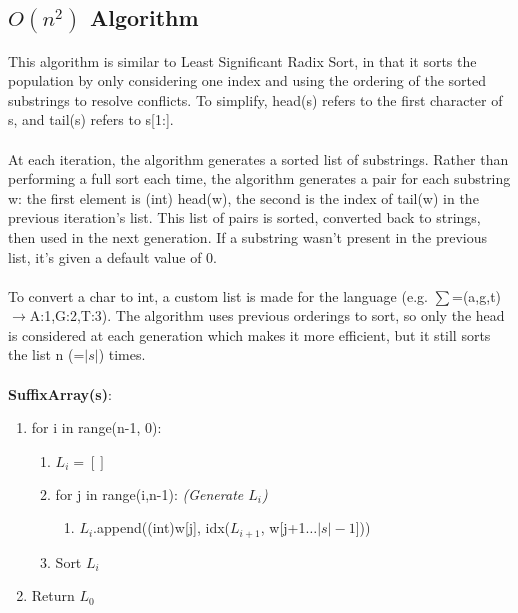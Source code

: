 \subsection{$O(n^2)$ Algorithm}
This algorithm is similar to Least Significant Radix Sort, in that it sorts the population by only considering one index and using the ordering of the sorted substrings to resolve conflicts. To simplify, head(s) refers to the first character of s, and tail(s) refers to s[1:]. \\ \\
At each iteration, the algorithm generates a sorted list of substrings. Rather than performing a full sort each time, the algorithm generates a pair for each substring w: the first element is (int) head(w), the second is the index of tail(w) in the previous iteration's list. This list of pairs is sorted, converted back to strings, then used in the next generation. If a substring wasn't present in the previous list, it's given a default value of 0. \\ \\
To convert a char to int, a custom list is made for the language (e.g. $\sum$=(a,g,t)$\rightarrow$A:1,G:2,T:3). The algorithm uses previous orderings to sort, so only the head is considered at each generation which makes it more efficient, but it still sorts the list n (=$|s|$) times. \\ \\
\textbf{SuffixArray(s)}:
\begin{enumerate}[label=\Alph*]
    \item for i in range(n-1, 0):
\begin{enumerate}[label=\arabic*]
    \item $L_i = []$
    \item for j in range(i,n-1): \emph{(Generate $L_i$)}
    \begin{enumerate}
        \item [] $L_i$.append((int)w[j], idx($L_{i+1}$, w[j+1$\dots |s|-1$]))
    \end{enumerate} 
    \item Sort $L_i$ 
\end{enumerate}    
    \item Return $L_0$
\end{enumerate}

